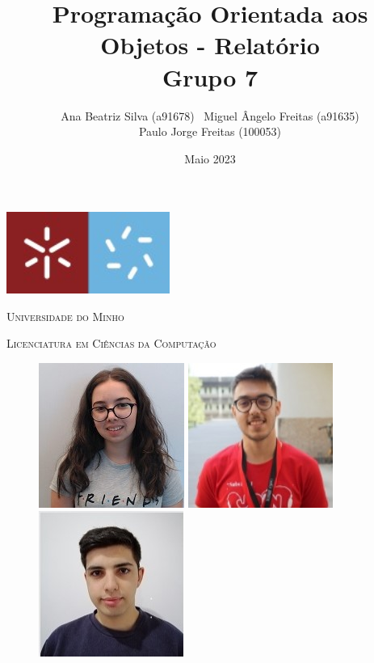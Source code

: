\documentclass[a4paper]{report}
\title{Programação Orientada aos Objetos - Relatório \\ \large{Grupo 7}}
\date{Maio 2023}
\author{Ana Beatriz Silva (a91678) \ Miguel Ângelo Freitas (a91635) \\ Paulo Jorge Freitas (100053) }
\begin{document}
	\begin{minipage}{0.9\linewidth}
        \centering
		\includegraphics[width=0.4\textwidth]{ecum.jpg}\par\vspace{1cm}
		{\scshape\LARGE Universidade do Minho} \par
		\vspace{0.6cm}
		{\scshape\Large Licenciatura em Ciências da Computação} \par
		\maketitle
		\begin{figure}[H]
			\includegraphics[width=0.32\linewidth]{ana.jpg}
			\includegraphics[width=0.32\linewidth]{miguel.jpg}
			\includegraphics[width=0.32\linewidth]{paulo.jpg}
		\end{figure}
	\end{minipage}
	
\end{document}
